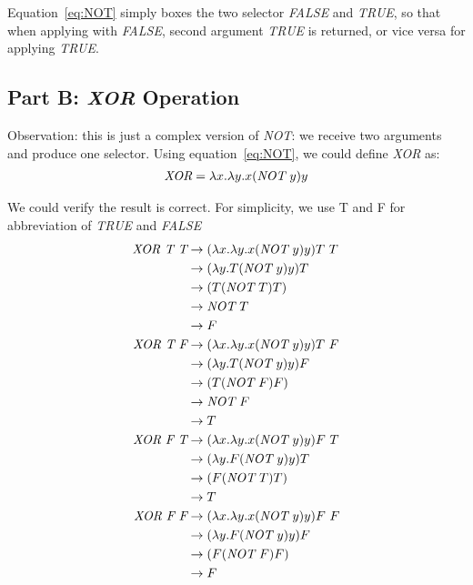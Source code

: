 \documentclass[paper=a4, fontsize=11pt]{scrartcl} %
\numberwithin{equation}{section} %
\numberwithin{figure}{section} %
\numberwithin{table}{section} %
\begin{document}
Equation~\eqref{eq:NOT} simply boxes the two selector \textit{FALSE} and \textit{TRUE}, so that when applying with \textit{FALSE}, second argument \textit{TRUE} is returned, or vice versa for applying \textit{TRUE}.

\subsection{Part B: \textit{XOR} Operation}
Observation: this is just a complex version of \textit{NOT}: we receive two arguments and produce one selector. Using equation~\eqref{eq:NOT}, we could define \textit{XOR} as:
\begin{align}
  \emph{XOR}=\lambda x. \lambda y. x (\textit{NOT\,\,} y) y \label{eq:XOR}
\end{align}

We could verify the result is correct. For simplicity, we use T and F for abbreviation of \textit{TRUE} and \textit{FALSE}
\begin{align*}
  \textit{XOR\,\,T\,\,T}& \rightarrow (\lambda x. \lambda y. x (\textit{NOT\,\,} y) y) T\,\,T\\
       & \rightarrow (\lambda y. T (\textit{NOT\,\,} y) y) T\\
       & \rightarrow (T (\textit{NOT\,\,} T) T)\\
       & \rightarrow \textit{NOT\,\,} T\\
       & \rightarrow F\\
  \textit{XOR\,\,T\,\,F}& \rightarrow (\lambda x. \lambda y. x (\textit{NOT\,\,} y) y) T\,\,F\\
       & \rightarrow (\lambda y. T (\textit{NOT\,\,} y) y) F\\
       & \rightarrow (T (\textit{NOT\,\,} F) F)\\
       & \rightarrow \textit{NOT\,\,} F\\
       & \rightarrow T\\
  \textit{XOR\,\,F\,\,T}& \rightarrow (\lambda x. \lambda y. x (\textit{NOT\,\,} y) y) F\,\,T\\
       & \rightarrow (\lambda y. F (\textit{NOT\,\,} y) y) T\\
       & \rightarrow (F (\textit{NOT\,\,} T) T)\\
       & \rightarrow T\\
  \textit{XOR\,\,F\,\,F}& \rightarrow (\lambda x. \lambda y. x (\textit{NOT\,\,} y) y) F\,\,F\\
       & \rightarrow (\lambda y. F (\textit{NOT\,\,} y) y) F\\
       & \rightarrow (F (\textit{NOT\,\,} F) F)\\
       & \rightarrow F\\
\end{align*}
\end{document}
